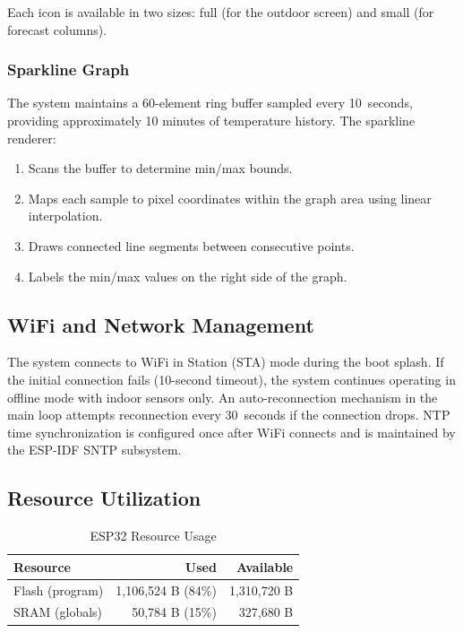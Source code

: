 \documentclass[conference]{IEEEtran}
\begin{document}
Each icon is available in two sizes: full (for the outdoor screen) and small (for forecast columns).

\subsubsection{Sparkline Graph}

The system maintains a 60-element ring buffer sampled every 10~seconds, providing approximately 10 minutes of temperature history. The sparkline renderer:
\begin{enumerate}
    \item Scans the buffer to determine min/max bounds.
    \item Maps each sample to pixel coordinates within the graph area using linear interpolation.
    \item Draws connected line segments between consecutive points.
    \item Labels the min/max values on the right side of the graph.
\end{enumerate}

\subsection{WiFi and Network Management}

The system connects to WiFi in Station (STA) mode during the boot splash. If the initial connection fails (10-second timeout), the system continues operating in offline mode with indoor sensors only. An auto-reconnection mechanism in the main loop attempts reconnection every 30~seconds if the connection drops. NTP time synchronization is configured once after WiFi connects and is maintained by the ESP-IDF SNTP subsystem.

\subsection{Resource Utilization}

\begin{table}[h]
\centering
\caption{ESP32 Resource Usage}
\label{tab:resources}
\begin{tabular}{lrr}
\toprule
\textbf{Resource} & \textbf{Used} & \textbf{Available} \\
\midrule
Flash (program) & 1,106,524 B (84\%) & 1,310,720 B \\
SRAM (globals) & 50,784 B (15\%) & 327,680 B \\
\bottomrule
\end{tabular}
\end{table}
\end{document}
